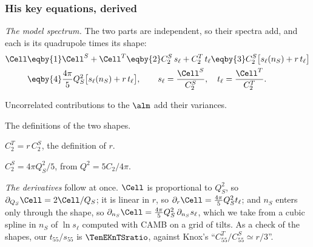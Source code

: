 \subsubsection*{His key equations, derived}

\emph{The model spectrum.} The two parts are independent, so their spectra add, and each is its quadrupole
times its shape:
\begin{align}
  \Cell
  &\eqby{1}\Cell^S+\Cell^T
   \eqby{2}C_2^S\,s_\ell+C_2^T\,t_\ell
   \eqby{3}C_2^S\bigl[s_\ell(n_S)+r\,t_\ell\bigr]
  \nonumber\\
  &\eqby{4}\frac{4\pi}5Q_S^2\bigl[s_\ell(n_S)+r\,t_\ell\bigr],
  \qquad s_\ell=\frac{\Cell^S}{C_2^S},\quad t_\ell=\frac{\Cell^T}{C_2^T}.
  \label{10a:eq:knox-model}
\end{align}
\begin{explain}
  \item Uncorrelated contributions to the $\alm$ add their variances.
  \item The definitions of the two shapes.
  \item $C_2^T=r\,C_2^S$, the definition of $r$.
  \item $C_2^S=4\pi Q_S^2/5$, from $Q^2=5C_2/4\pi$.
\end{explain}
\emph{The derivatives} follow at once. $\Cell$ is proportional to $Q_S^2$, so $\partial_{Q_S}\Cell=2\Cell/Q_S$; it is linear in
$r$, so $\partial_r\Cell=\frac{4\pi}5Q_S^2t_\ell$; and $n_S$ enters only through the shape, so $\partial_{n_S}\Cell=\frac{4\pi}5Q_S^2\,\partial_{n_S}s_\ell$, which
we take from a cubic spline in $n_S$ of $\ln s_\ell$ computed with CAMB on a grid of tilts. As a check of the shapes,
our $t_{55}/s_{55}$ is $\TenEKnTSratio$, against Knox's ``$C^T_{55}/C^S_{55}\simeq r/3$''.

